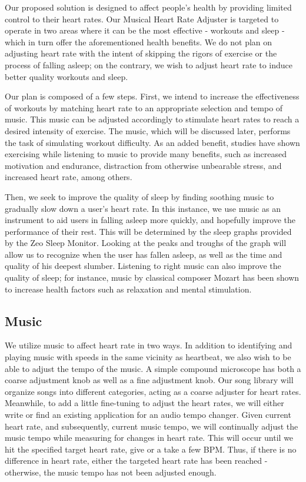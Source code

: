 \documentclass[letterpaper,english, 12pt]{scrreprt}
\begin{document}
Our proposed solution is designed to affect people's health by providing limited control to their heart rates. Our Musical Heart Rate Adjuster is targeted to operate in two areas where it can be the most effective - workouts and sleep - which in turn offer the aforementioned health benefits. We do not plan on adjusting heart rate with the intent of skipping the rigors of exercise or the process of falling asleep; on the contrary, we wish to adjust heart rate to induce better quality workouts and sleep.
			 
Our plan is composed of a few steps. First, we intend to increase the effectiveness of workouts by matching heart rate to an appropriate selection and tempo of music. This music can be adjusted accordingly to stimulate heart rates to reach a desired intensity of exercise. The music, which will be discussed later, performs the task of simulating workout difficulty. As an added benefit, studies have shown exercising while listening to music to provide many benefits, such as increased motivation and endurance, distraction from otherwise unbearable stress, and increased heart rate, among others.
			 
Then, we seek to improve the quality of sleep by finding soothing music to gradually slow down a user's heart rate. In this instance, we use music as an instrument to aid users in falling asleep more quickly, and hopefully improve the performance of their rest. This will be determined by the sleep graphs provided by the Zeo Sleep Monitor. Looking at the peaks and troughs of the graph will allow us to recognize when the user has fallen asleep, as well as the time and quality of his deepest slumber. Listening to right music can also improve the quality of sleep; for instance, music by classical composer Mozart has been shown to increase health factors such as relaxation and mental stimulation.
			 
\subsection{Music}
We utilize music to affect heart rate in two ways. In addition to identifying and playing music with speeds in the same vicinity as heartbeat, we also wish to be able to adjust the tempo of the music. A simple compound microscope has both a coarse adjustment knob as well as a fine adjustment knob. Our song library will organize songs into different categories, acting as a coarse adjuster for heart rates. Meanwhile, to add a little fine-tuning to adjust the heart rates, we will either write or find an existing application for an audio tempo changer. Given current heart rate, and subsequently, current music tempo, we will continually adjust the music tempo while measuring for changes in heart rate. This will occur until we hit the specified target heart rate, give or a take a few BPM. Thus, if there is no difference in heart rate, either the targeted heart rate has been reached - otherwise,  the music tempo has not been adjusted enough.
			 
\end{document}
